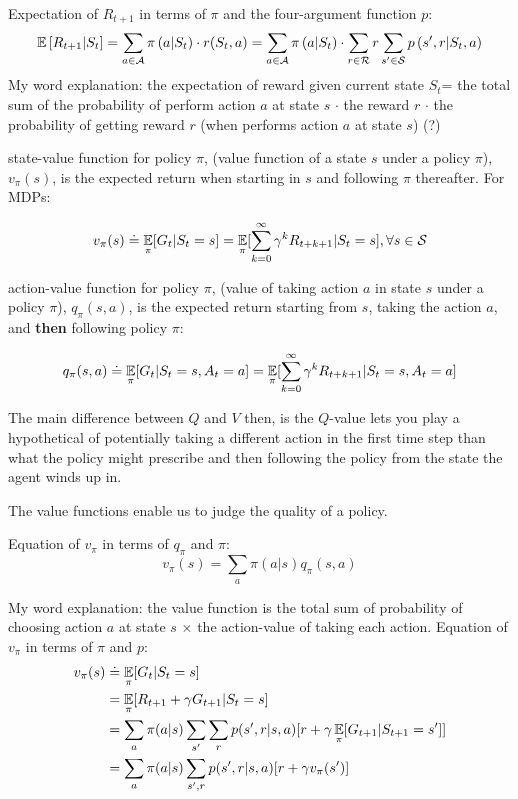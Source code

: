 \documentclass[sutton_barto_notes.tex]{subfiles}
\begin{document}
Expectation of $R_{t+1}$ in terms of $\pi$ and the four-argument function $p$:
\[
\operatorname*{\mathbb{E}}\left[R_{t+1} \middle|S_{t}\right] = \sum_{a \in \mathcal{A}} \pi\left(a \middle| S_t\right) \cdot r(S_t, a) = \sum_{a \in \mathcal{A}} \pi\left(a \middle| S_t\right) \cdot \sum_{r \in \mathcal{R}} r \sum_{s' \in \mathcal{S}} p\left(s', r \middle| S_t, a\right)
\]
My word explanation: the expectation of reward given current state $S_t$= the total sum of the probability of perform action $a$ at state $s$ $\cdot$ the reward $r$ $\cdot$ the probability of getting reward $r$ (when performs action $a$ at state $s$) (?)

\begin{definition}
state-value function for policy $\pi$, (value function of a state $s$ under a policy $\pi$), $v_{\pi}(s)$, is the expected return when starting in $s$ and following $\pi$ thereafter. For MDPs:

$$ v_\pi(s) \doteq \operatorname*{\mathbb{E}}_\pi[G_t | S_t = s] = \operatorname*{\mathbb{E}}_\pi [ \sum_{k=0}^{\infty} \gamma^k R_{t+k+1} | S_t = s], \forall s \in \mathcal{S} $$
\end{definition}

\begin{definition}
action-value function for policy $\pi$, (value of taking action $a$ in state $s$ under a policy $\pi$), $q_\pi(s,a)$, is the expected return starting from $s$, taking the action $a$, and \textbf{then} following policy $\pi$:

$$ q_\pi(s,a) \doteq \operatorname*{\mathbb{E}}_\pi [G_t | S_t = s, A_t = a] = \operatorname*{\mathbb{E}}_\pi [\sum_{k=0}^{\infty} \gamma^k R_{t+k+1} | S_t = s, A_t = a] $$
\end{definition}

The main difference between $Q$ and $V$ then, is the $Q$-value lets you play a hypothetical of potentially taking a different action in the first time step than what the policy might prescribe and then following the policy from the state the agent winds up in.

The value functions enable us to judge the quality of a policy.
\newline

Equation of $v_\pi$ in terms of $q_\pi$ and $\pi$:
$$ v_\pi(s) = \sum_a \pi(a|s)q_\pi(s,a) $$

My word explanation: the value function is the total sum of probability of choosing action $a$ at state $s$ $\times$ the action-value of taking each action.
\newline
Equation of $v_\pi$ in terms of $\pi$ and $p$:
\begin{align*}
v_\pi(s) & \doteq \operatorname*{\mathbb{E}}_\pi[G_t | S_t = s]\\
& = \operatorname*{\mathbb{E}}_\pi[R_{t+1} + \gamma G_{t+1} | S_t = s]\\
& = \sum_a \pi(a|s) \sum_{s'}\sum_r p(s',r|s,a) [r+ \gamma \operatorname*{\mathbb{E}}_\pi[G_{t+1} | S_{t+1}=s']]\\
& = \sum_a \pi(a|s) \sum_{s',r} p(s',r|s,a) [r+ \gamma v_\pi(s')]
\end{align*}
\end{document}
